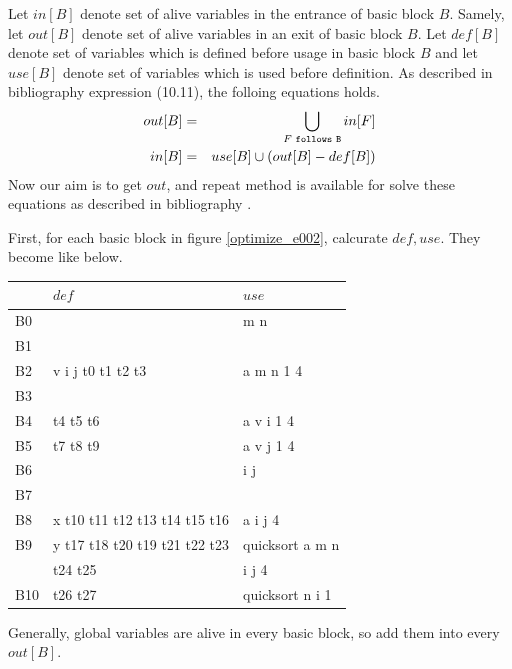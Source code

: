 Let $in[B]$ denote set of alive variables in the entrance of
basic block $B$. Samely, let $out[B]$ denote set of alive
variables in an exit of basic block $B$. Let $def[B]$ denote
set of variables which is defined before usage in basic
block $B$ and let $use[B]$ denote set of variables which is used before
definition. As described in bibliography \cite{doragon} expression
(10.11), the folloing equations holds.
\begin{eqnarray*}
out[B] & = & \bigcup_{F {\tt{\,\,follows\,\,} B}} in[F] \\
in[B]  & = & use[B] \cup (out[B] - def[B])
\end{eqnarray*}
Now our aim is to get $out$, and repeat method 
is available for solve these equations as described in bibliography
\cite{doragon}.

First, for each basic block in figure \ref{optimize_e002},
calcurate $def, use$. They become like below.

\vspace{0.5cm}

\begin{tabular}{|l|l|l|} \hline
   & $def$             & $use$     \\ \hline
B0 &                   & m n       \\ \hline
B1 &                   &           \\ \hline
B2 & v i j t0 t1 t2 t3 & a m n 1 4 \\ \hline
B3 &                   &           \\ \hline
B4 & t4 t5 t6          & a v i 1 4 \\ \hline
B5 & t7 t8 t9          & a v j 1 4 \\ \hline
B6 &                   & i j       \\ \hline
B7 &                   &           \\ \hline
B8 & x t10 t11 t12 t13 t14 t15 t16 & a i j 4 \\ \hline
B9 & y t17 t18 t20 t19 t21 t22 t23 & quicksort a m n \\
   & t24 t25                & i j 4 \\ \hline
B10 & t26 t27 & quicksort n i 1 \\ \hline
\end{tabular}

\vspace{0.5cm}

Generally, global variables are alive in every basic block, so
add them into every $out[B]$.

